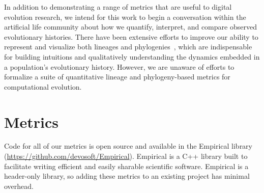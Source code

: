 \documentclass[letterpaper]{article}
\begin{document}
In addition to demonstrating a range of metrics that are %
useful to digital evolution research, we intend for this work to begin a conversation within the %
artificial life community about how we quantify, interpret, and compare observed evolutionary histories. There have been extensive efforts to improve our ability to represent and visualize both lineages and phylogenies~\citep{standish_visualising_2002,burlacu_visualization_2013, mcphee_using_2016,mcphee_visualizing_2016, lalejini_evolutionary_2016}, which are indispensable for building intuitions and qualitatively understanding the dynamics embedded in a population's evolutionary history. However, we are unaware of efforts to formalize a suite of quantitative lineage and phylogeny-based metrics for computational evolution. %

\section{Metrics}

Code for all of our metrics is open source and available in the Empirical library (\url{https://github.com/devosoft/Empirical}). Empirical is a C++ library built to facilitate writing efficient and easily sharable scientific software. %
Empirical is a header-only library, so adding these metrics to an existing project has minimal overhead.
\end{document}
